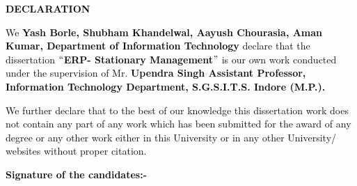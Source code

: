 \documentclass[12pt]{report}
\renewcommand{\_}{\kern-1.5pt\textunderscore\kern-1.5pt}
\begin{document}
\vspace{\baselineskip}
\begin{adjustwidth}{0.2in}{0.84in}
\begin{Center}
{\fontsize{22pt}{26.4pt}\selectfont \textbf{\textcolor[HTML]{0D0D0D}{DECLARATION}}\par}
\end{Center}\par

\end{adjustwidth}


\vspace{\baselineskip}

\vspace{\baselineskip}
\begin{adjustwidth}{0.2in}{0.84in}
\begin{justify}
\textcolor[HTML]{0D0D0D}{We \textbf{Yash Borle, Shubham Khandelwal, Aayush Chourasia, Aman Kumar, Department of Information Technology }declare that the dissertation \textbf{$``$ERP- Stationary Management$"$  }is our own work conducted under the supervision of Mr. \textbf{Upendra Singh Assistant Professor, Information Technology Department, S.G.S.I.T.S. Indore (M.P.).}}
\end{justify}\par

\end{adjustwidth}

\begin{adjustwidth}{0.2in}{0.84in}
\textcolor[HTML]{0D0D0D}{We further declare that to the best of our knowledge this dissertation work does not contain any part of any work which has been submitted for the award of any degree or any other work either in this University or in any other University/ websites without proper citation.}\par

\end{adjustwidth}


\vspace{\baselineskip}

\vspace{\baselineskip}

\vspace{\baselineskip}

\vspace{\baselineskip}

\vspace{\baselineskip}
\begin{adjustwidth}{0.2in}{0.84in}
\textbf{\textcolor[HTML]{0D0D0D}{Signature of the candidates:-}}\par

\end{adjustwidth}
\end{document}
